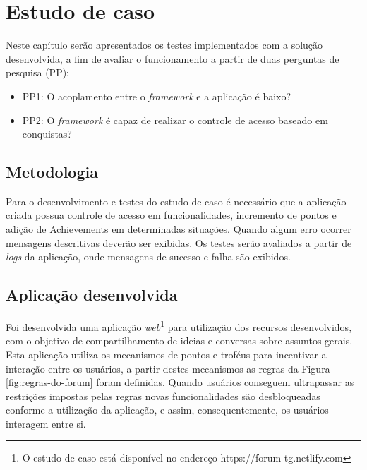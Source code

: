 \newpage
\chapter{Estudo de caso}

\par Neste capítulo serão apresentados os testes implementados com a solução desenvolvida, a fim de avaliar o funcionamento a partir de duas perguntas de pesquisa (PP):

\begin{itemize}
    \item PP1: O acoplamento entre o \textit{framework} e a aplicação é baixo?
    \item PP2: O \textit{framework} é capaz de realizar o controle de acesso baseado em conquistas?
\end{itemize}

\section{Metodologia}

\par Para o desenvolvimento e testes do estudo de caso é necessário que a aplicação criada possua controle de acesso em funcionalidades, incremento de pontos e adição de Achievements em determinadas situações. Quando algum erro ocorrer mensagens descritivas deverão ser exibidas. Os testes serão avaliados a partir de \textit{logs} da aplicação, onde mensagens de sucesso e falha são exibidos. %

\section{Aplicação desenvolvida}

\par Foi desenvolvida uma aplicação \textit{web}\footnote{O estudo de caso está disponível no endereço https://forum-tg.netlify.com} para utilização dos recursos desenvolvidos, com o objetivo de compartilhamento de ideias e conversas sobre assuntos gerais. Esta aplicação utiliza os mecanismos de pontos e troféus para incentivar a interação entre os usuários, a partir destes mecanismos as regras da Figura \ref{fig:regras-do-forum} foram definidas. Quando usuários conseguem ultrapassar as restrições impostas pelas regras novas funcionalidades são desbloqueadas conforme a utilização da aplicação, e assim, consequentemente, os usuários interagem entre si.

